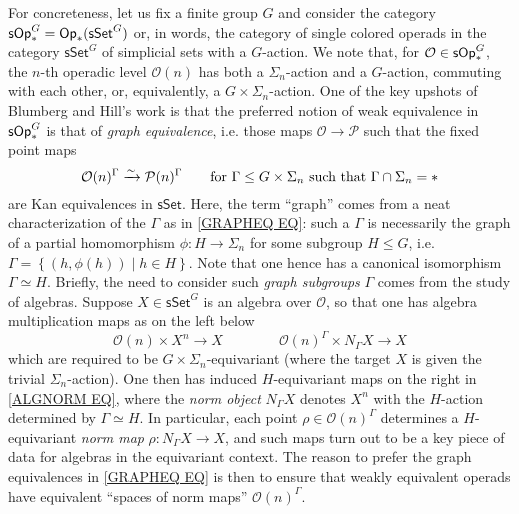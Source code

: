 \documentclass[a4paper,10pt
,draft
]{article}%
\numberwithin{equation}{section}
\numberwithin{figure}{section}
\theoremstyle{definition} %
\newcommand{\sets}[2]{\left\{ #1 \;|\; #2\right\}}%
\renewcommand{\O}{\ensuremath{\mathcal O}}
\newcommand{\1}{\ensuremath{\mathbbm 1}}%
\begin{document}
For concreteness, let us fix a finite group $G$
and consider the category
$\mathsf{sOp}^{G}_{\**} = \mathsf{Op}_{\**}(\mathsf{sSet}^G)$
or, in words,
the category of single colored operads
in the category $\mathsf{sSet}^G$
of simplicial sets with a $G$-action.
We note that, for $\O \in \mathsf{sOp}^{G}_{\**}$,
the $n$-th operadic level $\O(n)$ has both a $\Sigma_n$-action and a $G$-action, commuting with each other, or, equivalently, 
a $G \times \Sigma_n$-action.
One of the key upshots
of Blumberg and Hill's work \cite{BH15}
is that the preferred notion of weak equivalence in $\mathsf{sOp}^{G}_{\**}$
is that of \emph{graph equivalence},
i.e. those maps 
$\O \to \mathcal{P}$
such that the fixed point maps
\begin{equation}\label{GRAPHEQ EQ}
\O(n)^{\Gamma} \xrightarrow{\sim} \mathcal{P}(n)^{\Gamma}
\qquad
\text{for }
\Gamma \leq G \times \Sigma_n
\text{ such that }
\Gamma \cap \Sigma_n = \**
\end{equation}
are Kan equivalences in $\mathsf{sSet}$.
%
Here, the term ``graph'' comes from a neat characterization of the $\Gamma$
as in \eqref{GRAPHEQ EQ}:
such a $\Gamma$ is necessarily the graph of a partial homomorphism
$\phi \colon H \to \Sigma_n$ for some subgroup $H \leq G$,
i.e.
$\Gamma = \sets{(h,\phi(h))}{h \in H}$. 
Note that one hence has a canonical isomorphism $\Gamma \simeq H$.
%
Briefly, the need to consider such \emph{graph subgroups} $\Gamma$ comes from the study of algebras.
Suppose $X \in \mathsf{sSet}^G$ is an algebra over
$\O$,
so that one has algebra multiplication maps
as on the left below
\begin{equation}\label{ALGNORM EQ}
\O(n) \times X^n \to X
\qquad \qquad
\O(n)^{\Gamma} \times N_{\Gamma}X \to X
\end{equation}
which are required to be 
$G \times \Sigma_n$-equivariant
(where the target $X$ is given the trivial $\Sigma_n$-action).
One then has induced 
$H$-equivariant maps 
on the right in \eqref{ALGNORM EQ},
where the \emph{norm object} $N_{\Gamma} X$
denotes $X^{n}$ with the $H$-action determined by $\Gamma \simeq H$.
In particular, each point
$\rho \in \O(n)^{\Gamma}$
determines a $H$-equivariant \emph{norm map}
$\rho \colon N_{\Gamma} X \to X$,  
and such maps turn out to be a key piece of data
for algebras in the equivariant context.
The reason to prefer the graph equivalences in \eqref{GRAPHEQ EQ}
is then to ensure that weakly equivalent operads
have equivalent ``spaces of norm maps'' $\O(n)^{\Gamma}$.
\end{document}
